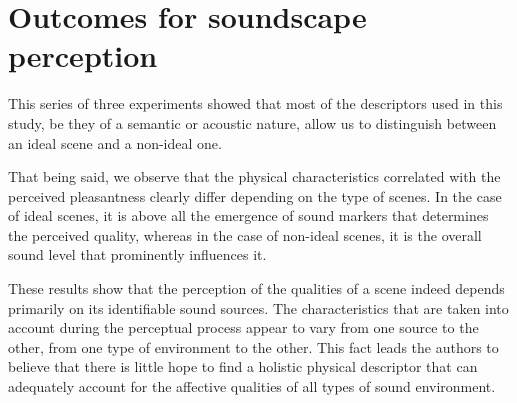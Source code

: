 \documentclass[12pt]{elsarticle}
\begin{document}


\section{Outcomes for soundscape perception}
\label{sec:conclusion}


This series of three experiments showed that most of the descriptors used in this study, be they of a semantic or acoustic nature, allow us to distinguish between an ideal scene and a non-ideal one.


That being said, we observe that the physical characteristics correlated with the perceived pleasantness clearly differ depending on the type of scenes. In the case of ideal scenes, it is above all the emergence of sound markers that determines the perceived quality, whereas in the case of non-ideal scenes, it is the overall sound level that prominently influences it.


These results show that the perception of the qualities of a scene indeed depends primarily on its identifiable sound sources. The characteristics that are taken into account during the perceptual process appear to vary from one source to the other, from one type of environment to the other. This fact leads the authors to believe that there is little hope to find a holistic physical descriptor that can adequately account for the affective qualities of all types of sound environment.
\end{document}
